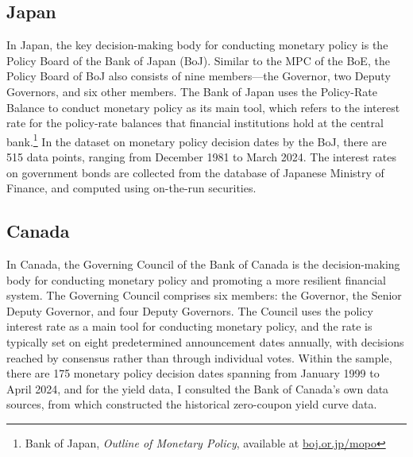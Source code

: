 \subsection{Japan}
In Japan, the key decision-making body for conducting monetary policy is the Policy Board of the Bank of Japan (BoJ). Similar to the MPC of the BoE, the Policy Board of BoJ also consists of nine members---the Governor, two Deputy Governors, and six other members. The Bank of Japan uses the Policy-Rate Balance to conduct monetary policy as its main tool, which refers to the interest rate for the policy-rate balances that financial institutions hold at the central bank.\footnote{Bank of Japan, \textit{Outline of Monetary Policy}, available at \href{https://www.boj.or.jp/en/mopo/outline/index.htm}{boj.or.jp/mopo}} In the dataset on monetary policy decision dates by the BoJ, there are 515 data points, ranging from December 1981 to March 2024. The interest rates on government bonds are collected from the database of Japanese Ministry of Finance, and computed using on-the-run securities.


\subsection{Canada}

In Canada, the Governing Council of the Bank of Canada is the decision-making body for conducting monetary policy and promoting a more resilient financial system. The Governing Council comprises six members: the Governor, the Senior Deputy Governor, and four Deputy Governors. The Council uses the policy interest rate as a main tool for conducting monetary policy, and the rate is typically set on eight predetermined announcement dates annually, with decisions reached by consensus rather than through individual votes. Within the sample, there are 175 monetary policy decision dates spanning from January 1999 to April 2024, and for the yield data, I consulted the Bank of Canada's own data sources, from which \citet{bolder2004empirical} constructed the historical zero-coupon yield curve data.


